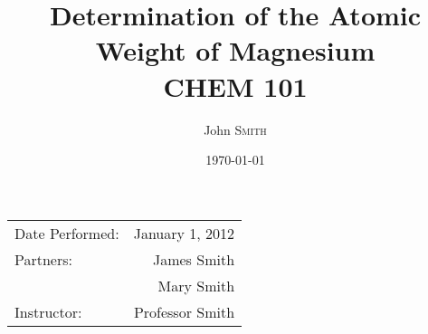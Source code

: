 \documentclass{article}
\title{Determination of the Atomic \\ Weight of Magnesium \\ CHEM 101} %
\author{John \textsc{Smith}} %
\date{\today} %
\begin{document}
	
	\maketitle %
	
	\begin{center}
		\begin{tabular}{l r}
			Date Performed: & January 1, 2012 \\ %
			Partners: & James Smith \\ %
			& Mary Smith \\
			Instructor: & Professor Smith %
		\end{tabular}
	\end{center}
	
	
	

	
	
	
	
	
	
	
\end{document}
